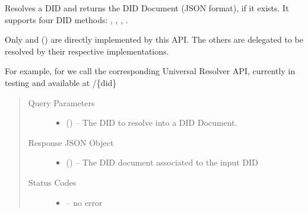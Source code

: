 \documentclass[a4paper,12pt,english,openany]{sphinxmanual}
\begin{document}
\begin{savenotes}\begin{fulllineitems}
\sphinxAtStartPar
Resolves a DID and returns the DID Document (JSON format), if it exists.
It supports four DID methods: , , , .

\sphinxAtStartPar
Only  and  () are directly implemented by this API.
The others are delegated to be resolved by their respective implementations.

\sphinxAtStartPar
For example, for  we call the corresponding Universal Resolver API, currently in testing and available at
/\{did\}
\begin{quote}\begin{description}
\item[{Query Parameters}] \leavevmode\begin{itemize}
\item {} 
\sphinxAtStartPar
{} () – The DID to resolve into a DID Document.

\end{itemize}

\item[{Response JSON Object}] \leavevmode\begin{itemize}
\item {} 
\sphinxAtStartPar
{} () – The DID document associated to the input DID

\end{itemize}

\item[{Status Codes}] \leavevmode\begin{itemize}
\item {} 
\sphinxAtStartPar
{}%
\begin{footnote}[8]\sphinxAtStartFootnote
{}
%
\end{footnote} – no error


\end{itemize}
\end{description}
\end{quote}
\end{fulllineitems}
\end{savenotes}
\end{document}
